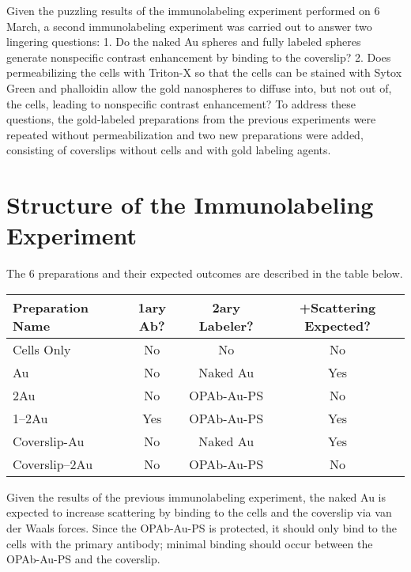 Given the puzzling results of the immunolabeling experiment performed on 6 March, a second immunolabeling experiment was carried out to answer two lingering questions:
1. Do the naked Au spheres and fully labeled spheres generate nonspecific contrast enhancement by binding to the coverslip?
2. Does permeabilizing the cells with Triton-X so that the cells can be stained with Sytox Green and phalloidin allow the gold nanospheres to diffuse into, but not out of, the cells, leading to nonspecific contrast enhancement?
To address these questions, the gold-labeled preparations from the previous experiments were repeated without permeabilization and two new preparations were added, consisting of coverslips without cells and with gold labeling agents.

\section{Structure of the Immunolabeling Experiment}
\label{structureoftheimmunolabelingexperiment}

The 6 preparations and their expected outcomes are described in the table below.

\begin{table}[htbp]
\begin{minipage}{\linewidth}
\setlength{\tymax}{0.5\linewidth}
\centering
\small
\begin{tabular}{@{}lccc@{}} \toprule
Preparation Name&1ary Ab?&2ary Labeler?&+Scattering Expected?\\
\midrule
Cells Only&No&No&No\\
Au&No&Naked Au&Yes\\
2Au&No&OPAb-Au-PS&No\\
1--2Au&Yes&OPAb-Au-PS&Yes\\
Coverslip-Au&No&Naked Au&Yes\\
Coverslip--2Au&No&OPAb-Au-PS&No\\

\bottomrule

\end{tabular}
\end{minipage}
\end{table}


Given the results of the previous immunolabeling experiment, the naked Au is expected to increase scattering by binding to the cells and the coverslip via van der Waals forces. Since the OPAb-Au-PS is protected, it should only bind to the cells with the primary antibody; minimal binding should occur between the OPAb-Au-PS and the coverslip. 

